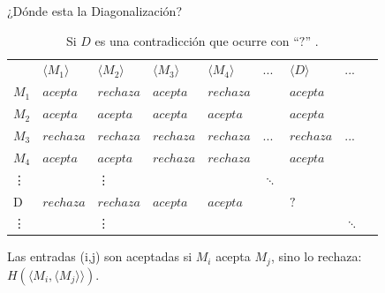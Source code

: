 \documentclass[11pt]{beamer}
\begin{document}
		\begin{frame}{¿Dónde esta la Diagonalización?}
		
		    \justifying
		    
		    \begin{table}[]
            \begin{tabular}{lllllllll}
                  & $\langle M_1 \rangle$   &  $\langle M_2 \rangle$      & $\langle M_3 \rangle$      & $\langle M_4 \rangle$      & ... & $\langle D \rangle$ & ... \\ \cline{2-8}
            \multicolumn{1}{l|}{$M_1$} & \underline{$acepta$} & $rechaza$ & $acepta$ & $rechaza$ &  & $acepta$ &    \\
            \multicolumn{1}{l|}{$M_2$} & $acepta$ & \underline{$acepta$} & $acepta$ & $acepta$ &  & $acepta$ &   \\
            \multicolumn{1}{l|}{$M_3$} & $rechaza$ & $rechaza$ & \underline{$rechaza$} & $rechaza$ & ...  & $rechaza$ &  ...   \\
            \multicolumn{1}{l|}{$M_4$} & $acepta$ & $acepta$ & $rechaza$ & \underline{$rechaza$} & & $acepta$ &   \\
            \multicolumn{1}{l|}{\vdots}   &        & \vdots     &        &        & $\ddots$ &  & \\
            \multicolumn{1}{l|}{D}   & $rechaza$ & $rechaza$ & $acepta$ & $acepta$ &   & \underline{$?$} & \\
            \multicolumn{1}{l|}{\vdots}   &        & \vdots     &        &        &  &   & $\ddots$
            \end{tabular}
            \caption{Si $D$ es una contradicción que ocurre con ``$?$'' .}
             \label{table:contradiccion}
           \end{table}
             
             
			
			Las entradas (i,j) son aceptadas si $M_i$ acepta $M_j$, sino lo rechaza: $H(\langle M_i, \langle M_j \rangle \rangle)$.
			
		\end{frame}
		
		
\end{document}
